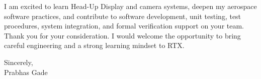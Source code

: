 \documentclass[letterpaper,11pt]{letter}
\begin{document}
I am excited to learn Head-Up Display and camera systems, deepen my aerospace software practices, and contribute to software development, unit testing, test procedures, system integration, and formal verification support on your team. Thank you for your consideration. I would welcome the opportunity to bring careful engineering and a strong learning mindset to RTX.

Sincerely,\\
Prabhas Gade
\end{document}
